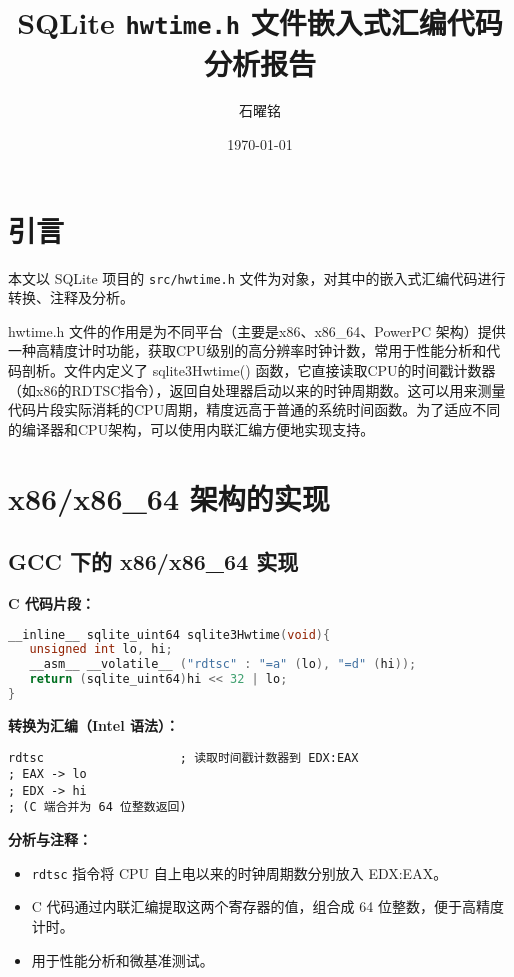 \documentclass[12pt]{article}
\title{SQLite \texttt{hwtime.h} 文件嵌入式汇编代码分析报告}
\author{石曜铭}
\date{\today}
\begin{document}
\maketitle

\section{引言}
本文以 SQLite 项目的 \texttt{src/hwtime.h} 文件为对象，对其中的嵌入式汇编代码进行转换、注释及分析。

hwtime.h 文件的作用是为不同平台（主要是x86、x86\_64、PowerPC 架构）提供一种高精度计时功能，获取CPU级别的高分辨率时钟计数，常用于性能分析和代码剖析。文件内定义了 sqlite3Hwtime() 函数，它直接读取CPU的时间戳计数器（如x86的RDTSC指令），返回自处理器启动以来的时钟周期数。这可以用来测量代码片段实际消耗的CPU周期，精度远高于普通的系统时间函数。为了适应不同的编译器和CPU架构，可以使用内联汇编方便地实现支持。

\section{x86/x86\_64 架构的实现}

\subsection{GCC 下的 x86/x86\_64 实现}

\textbf{C 代码片段：}
\begin{lstlisting}[language=C]
__inline__ sqlite_uint64 sqlite3Hwtime(void){
   unsigned int lo, hi;
   __asm__ __volatile__ ("rdtsc" : "=a" (lo), "=d" (hi));
   return (sqlite_uint64)hi << 32 | lo;
}
\end{lstlisting}

\textbf{转换为汇编（Intel 语法）：}
\begin{lstlisting}[language={[x86masm]Assembler}]
rdtsc                   ; 读取时间戳计数器到 EDX:EAX
; EAX -> lo
; EDX -> hi
; (C 端合并为 64 位整数返回)
\end{lstlisting}

\textbf{分析与注释：}
\begin{itemize}
  \item \texttt{rdtsc} 指令将 CPU 自上电以来的时钟周期数分别放入 EDX:EAX。
  \item C 代码通过内联汇编提取这两个寄存器的值，组合成 64 位整数，便于高精度计时。
  \item 用于性能分析和微基准测试。
\end{itemize}
\end{document}
